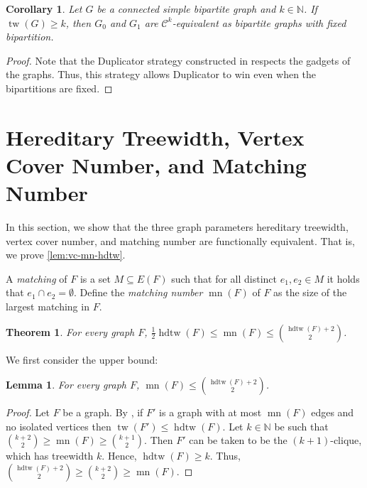 \documentclass[11pt, DIV=15]{scrarticle}
\theoremstyle{definition}
\theoremstyle{plain}
\newtheorem{lemma}[definition]{Lemma}
\newtheorem{corollary}[definition]{Corollary}
\newtheorem{theorem}[definition]{Theorem}
\theoremstyle{remark}
\DeclareMathOperator{\tw}{tw}
\DeclareMathOperator{\hdtw}{hdtw}
\DeclareMathOperator{\mn}{mn}
\begin{document}
	\begin{corollary}\label{thm:neuen-bipartite}
		Let $G$ be a connected simple bipartite graph and $k \in \mathbb{N}$.
		If $\tw(G) \geq k$, then $G_0$ and $G_1$ are $\mathcal{C}^k$-equivalent as bipartite graphs with fixed bipartition.
	\end{corollary}
	\begin{proof}
		Note that the Duplicator strategy constructed in \cite[Lemmas~11 and~12]{neuen_homomorphism-distinguishing_2024} respects the gadgets of the  graphs.
		Thus, this strategy allows Duplicator to win even when the bipartitions are fixed.
	\end{proof}
	
	
	
	
	\section{Hereditary Treewidth, Vertex Cover Number, and Matching Number}
	\label{sec:hdtw}
	In this section, we show that the three graph parameters hereditary treewidth, vertex cover number, and matching number are functionally equivalent.
	That is, we prove \cref{lem:vc-mn-hdtw}.
	
	
	A \emph{matching} of $F$ is a set $M \subseteq E(F)$ such that for all distinct $e_1, e_2 \in M$ it holds that $e_1 \cap e_2 = \emptyset$.
	Define the \emph{matching number} $\mn(F)$ of $F$ as the size of the largest matching in $F$.
	\begin{theorem} \label{thm:mn-hdtw}
		For every graph $F$,
		$\frac12 \hdtw(F) \leq \mn(F) \leq \binom{\hdtw(F) + 2}{2}$.
	\end{theorem}
	
	We first consider the upper bound:
	
	\begin{lemma}
		For every graph $F$,
		$\mn(F) \leq \binom{\hdtw(F)+2}{2}$.
	\end{lemma}
	\begin{proof}
		Let $F$ be a graph.
		By \cite[Fact~3.4]{curticapean_homomorphisms_2017},
		if $F'$ is a graph with at most $\mn( F)$ edges and no isolated vertices then $\tw(F') \leq \hdtw(F)$.
		Let $k \in \mathbb{N}$ be such that $\binom{k+2}{2} \geq \mn(F) \geq \binom{k+1}{2}$.
		Then $F'$ can be taken to be the $(k+1)$-clique, which has treewidth $k$.
		Hence, $\hdtw(F) \geq k$.
		Thus, $\binom{\hdtw(F) +2}{2} \geq \binom{k+2}{2} \geq \mn(F)$.
	\end{proof}
	
\end{document}
